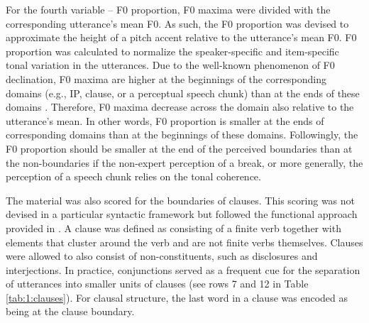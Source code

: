 \documentclass[output=paper]{langscibook}
\begin{document}
    For the fourth variable  --  F0 proportion, F0 maxima were divided with the corresponding utterance’s mean F0. As such, the F0 proportion was devised to approximate the height of a pitch accent relative to the utterance's mean F0. F0 proportion was calculated to normalize the speaker-specific and item-specific tonal variation in the utterances. Due to the well-known phenomenon of F0 declination, F0 maxima are higher at the beginnings of the corresponding domains (e.g., IP, clause, or a perceptual speech chunk) than at the ends of these domains \citep[][]{cooperSorensen1981, libermanPierr1984, yuanLiberman2014}. Therefore, F0 maxima decrease across the domain also relative to the utterance's mean. In other words, F0 proportion is smaller at the ends of corresponding domains than at the beginnings of these domains. Followingly, the F0 proportion should be smaller at the end of the perceived boundaries than at the non-boundaries if the non-expert perception of a break, or more generally, the perception of a speech chunk relies on the tonal coherence.

    The material was also scored for the boundaries of clauses. This scoring was not devised in a particular syntactic framework but followed the functional approach provided in \citet[][]{estSynt2017}. A clause was defined as consisting of a finite verb together with elements that cluster around the verb and are not finite verbs themselves. Clauses were allowed to also consist of non-constituents, such as disclosures and interjections. In practice, conjunctions served as a frequent cue for the separation of utterances into smaller units of clauses  (see rows 7 and 12 in Table \ref{tab:1:clauses}). For clausal structure, the last word in a clause was encoded as being at the clause boundary.
    
\end{document}
